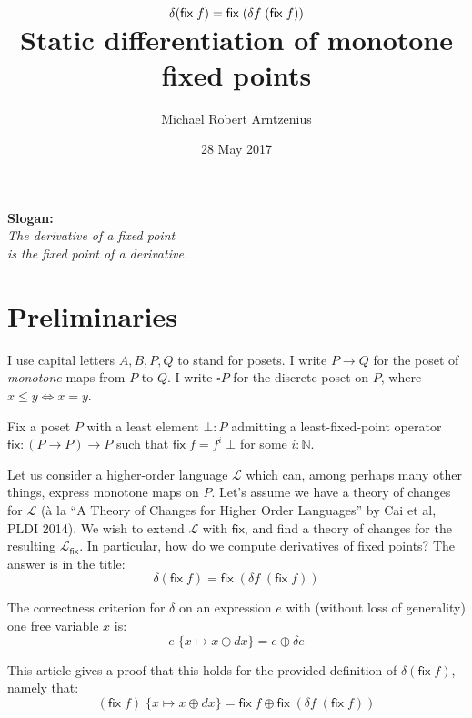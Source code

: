 \documentclass{article}
\title{$\dv(\fix\;f) = \fix\;(\dv{f} \; (\fix\;f))$
  \\\vspace{0.5em}
\large Static differentiation of monotone fixed points}
\author{Michael Robert Arntzenius}
\date{28 May 2017}
\newcommand{\ms}[1]{\ensuremath{\mathsf{#1}}}
\newcommand{\mc}[1]{\ensuremath{\mathcal{#1}}}
\newcommand{\N}{\mathbb{N}}
\newcommand{\sub}[1]{\;\{{#1}\}}
\newcommand{\Disc}[1]{\square{#1}}
\theoremstyle{definition}
\newcommand{\fix}{\ms{fix}}
\newcommand{\dv}{\delta}
\begin{document}
\maketitle

\begin{center}
  \large
  \textbf{Slogan:}\\
  \it The derivative of a fixed point\\
  is the fixed point of a derivative.
\end{center}

\section{Preliminaries}

I use capital letters $A, B, P, Q$ to stand for posets. I write $P \to Q$ for
the poset of \emph{monotone} maps from $P$ to $Q$. I write $\Disc{P}$ for the
discrete poset on $P$, where $x \le y \iff x = y$.

Fix a poset $P$ with a least element $\bot : P$ admitting a least-fixed-point
operator $\fix : (P \to P) \to P$ such that $\fix\;f = f^i\;\bot$ for some $i :
\N$.

Let us consider a higher-order language $\mc{L}$ which can, among perhaps many
other things, express monotone maps on $P$. Let's assume we have a theory of
changes for $\mc{L}$ (\`a la ``A Theory of Changes for Higher Order Languages''
by Cai et al, PLDI 2014). We wish to extend $\mc{L}$ with $\fix$, and find a
theory of changes for the resulting $\mc{L}_\fix$. In particular, how do we
compute derivatives of fixed points? The answer is in the title:
\[ \dv(\fix\;f) = \fix\;(\dv{f} \; (\fix\;f)) \]


The correctness criterion for $\dv$ on an expression $e$ with (without loss of
generality) one free variable $x$ is:
\begin{equation}
  e \sub{x \mapsto x \oplus dx} = e \oplus \dv e
  \label{eqn:correctness}
\end{equation}

This article gives a proof that this holds for the provided definition of
$\dv(\fix\;f)$, namely that:
\[ (\fix\;f) \sub{x \mapsto x \oplus dx} = \fix\;f \oplus \fix\;(\dv f \; (\fix\;f)) \]
\end{document}
